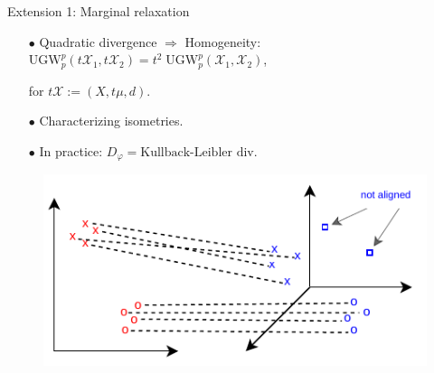 \documentclass{beamer}
\newcommand{\ugw}{\text{UGW}}
\newcommand{\cX}{\mathcal X}
\begin{document}
\begin{frame}{Extension 1: Marginal relaxation}
  \begin{minipage}[t]{0.6\linewidth}
  \begin{itemize}
    \item[$\bullet$] Quadratic divergence $\Rightarrow$ Homogeneity:
    $\ugw_p^p(t\cX_1, t \cX_2) = t^2 \; \ugw_p^p(\cX_1, \cX_2)$,

    for $t \cX := (X, t\mu, d)$.
    \item[$\bullet$] Characterizing isometries.
    \item[$\bullet$] In practice: $D_{\varphi} = \text{Kullback-Leibler div}$.
  \end{itemize}
  \end{minipage}%
  \hfill%
  \hspace{-6cm}
  \begin{minipage}[t]{0.5\linewidth}
    \vspace{-0.cm}
  \begin{figure}
    \centering
    \includegraphics[width=1.1\linewidth, keepaspectratio=true]{OT_new/ugw.pdf}
  \end{figure}
  \end{minipage}

\end{frame}
\end{document}
